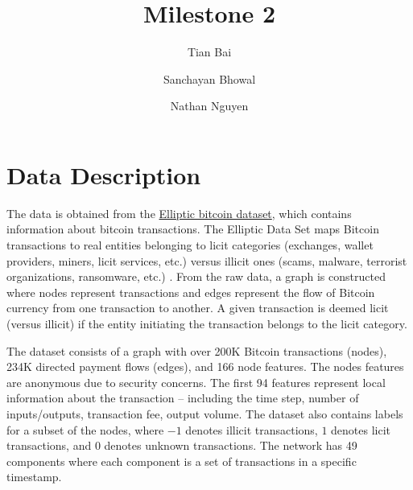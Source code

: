 \documentclass[11pt,reqno]{amsart}
\title[]{Milestone 2}
\author[]{Tian Bai}
\author[]{ Sanchayan Bhowal}
\author[]{ Nathan Nguyen}
\begin{document}
\maketitle
\section{Data Description}
The data is obtained from the  \href{https://pytorch-geometric.readthedocs.io/en/stable/generated/torch_geometric.datasets.EllipticBitcoinDataset.html}{Elliptic bitcoin dataset}, which contains information about bitcoin transactions. The Elliptic Data Set maps Bitcoin transactions to real entities belonging to licit categories (exchanges, wallet providers, miners,
licit services, etc.) versus illicit ones (scams, malware, terrorist organizations, ransomware, etc.) \cite{weber2019antimoneylaunderingbitcoinexperimenting}. From the raw data, a graph is constructed where nodes represent transactions and edges represent the flow of Bitcoin currency from one transaction to another. A given
transaction is deemed licit (versus illicit) if the entity initiating the transaction belongs to the licit category. 

The dataset consists of a graph with over 200K Bitcoin transactions (nodes), 234K directed payment flows (edges), and 166 node features. The nodes features are anonymous due to security concerns. The first 94
features represent local information about the transaction – including the time step, number of inputs/outputs, transaction fee, output volume. The dataset also contains labels for a subset of the nodes, where $-1$ denotes illicit transactions, $1$ denotes licit transactions, and $0$ denotes unknown transactions. The network has 49 components where each component is a set of transactions in a specific timestamp. 
\end{document}
